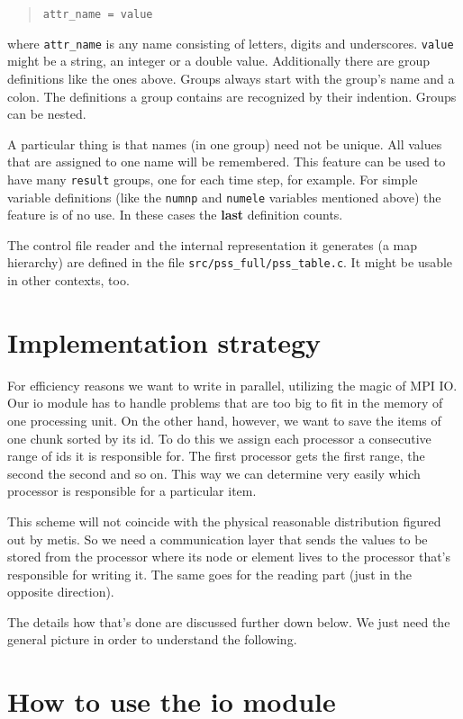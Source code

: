 \begin{quote}
\texttt{attr{\_}name~=~value }
\end{quote}
where \texttt{attr{\_}name} is any name consisting of letters, digits
and underscores. \texttt{value} might be a string, an integer or a
double value. Additionally there are group definitions like the ones
above. Groups always start with the group's name and a colon. The
definitions a group contains are recognized by their indention. Groups
can be nested.

A particular thing is that names (in one group) need not be unique.
All values that are assigned to one name will be remembered. This
feature can be used to have many \texttt{result} groups, one for each
time step, for example. For simple variable definitions (like the
\texttt{numnp} and \texttt{numele} variables mentioned above) the
feature is of no use. In these cases the \textbf{last} definition
counts.

The control file reader and the internal representation it generates
(a map hierarchy) are defined in the file \texttt{src/pss{\_}full/pss{\_}table.c}.
It might be usable in other contexts, too.


\section{Implementation strategy}

For efficiency reasons we want to write in parallel, utilizing the
magic of MPI IO. Our io module has to handle problems that are too
big to fit in the memory of one processing unit. On the other hand,
however, we want to save the items of one chunk sorted by its id.
To do this we assign each processor a consecutive range of ids it
is responsible for. The first processor gets the first range, the
second the second and so on. This way we can determine very easily
which processor is responsible for a particular item.

This scheme will not coincide with the physical reasonable distribution
figured out by metis. So we need a communication layer that sends
the values to be stored from the processor where its node or element
lives to the processor that's responsible for writing it. The same
goes for the reading part (just in the opposite direction).

The details how that's done are discussed further down below. We just
need the general picture in order to understand the following.


\section{How to use the io module}


